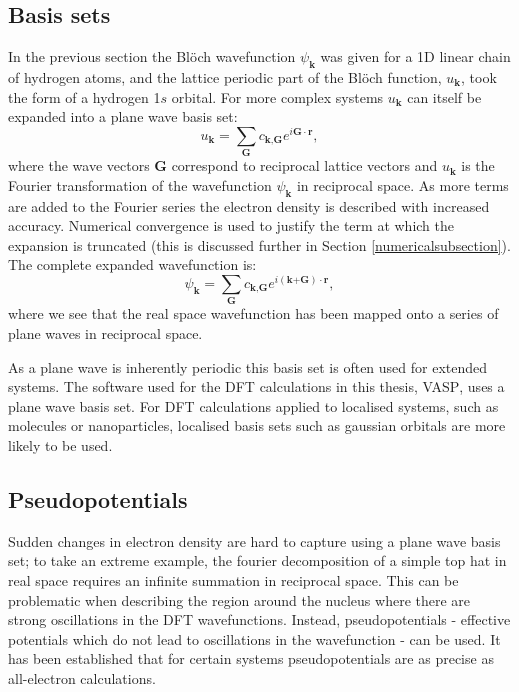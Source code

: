 \subsection{Basis sets} \label{basissetsection}

In the previous section the Bl\"{o}ch wavefunction $\psi_\mathbf{k}$ was given for a 1D linear chain of hydrogen atoms, and the lattice periodic part of the Bl\"{o}ch function, $u_\mathbf{k}$, took the form of a hydrogen 1$s$ orbital. For more complex systems $u_\mathbf{k}$ can itself be expanded into a plane wave basis set:
\begin{equation}
u_\textbf{k} = \sum_\textbf{G}c_{\textbf{k},\textbf{G}}e^{i\textbf{G}\cdot\textbf{r}},
\end{equation}
where the wave vectors $\textbf{G}$ correspond to reciprocal lattice vectors and $u_\textbf{k}$ is the Fourier transformation of the wavefunction $\psi_\mathbf{k}$ in reciprocal space. 
As more terms are added to the Fourier series the electron density is described with increased accuracy.
Numerical convergence is used to justify the term at which the expansion is truncated (this is discussed further in Section \ref{numericalsubsection}).
The complete expanded wavefunction is:
\begin{equation} \label{KSeigenstates}
\psi_\textbf{k} = \sum_\textbf{G}c_{\textbf{k},\textbf{G}}e^{i(\textbf{k+G})\cdot\textbf{r}},
\end{equation}
where we see that the real space wavefunction has been mapped onto a series of plane waves in reciprocal space.

As a plane wave is inherently periodic this basis set is often used for extended systems. The software used for the DFT calculations in this thesis, \textsc{VASP},\autocite{Kresse1996} uses a plane wave basis set. For DFT calculations applied to localised systems, such as molecules or nanoparticles, localised basis sets such as gaussian orbitals are more likely to be used.

\subsection{Pseudopotentials}

Sudden changes in electron density are hard to capture using a plane wave basis set; to take an extreme example, the fourier decomposition of a simple top hat in real space requires an infinite summation in reciprocal space. This can be problematic when describing the region around the nucleus where there are strong oscillations in the DFT wavefunctions. Instead, pseudopotentials - effective potentials which do not lead to oscillations in the wavefunction - can be used. It has been established that for certain systems pseudopotentials are as precise as all-electron calculations.\autocite{Lejaeghere2016}

